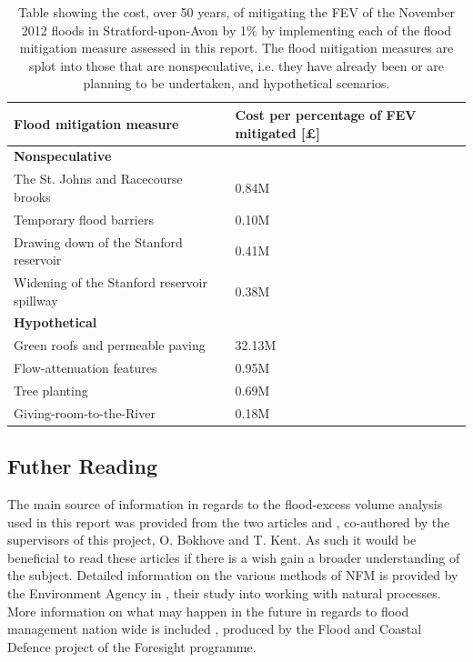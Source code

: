 \documentclass[11pt,a4paper]{article}
\begin{document}
\begin{table}[ht!]
\centering
\begin{tabular}{l|l}
Flood mitigation measure & Cost per percentage of FEV mitigated [\pounds]\\
\hline
\textbf{Nonspeculative} & \\
The St. Johns and Racecourse brooks & 0.84M\\
Temporary flood barriers & 0.10M\\
Drawing down of the Stanford reservoir & 0.41M\\
Widening of the Stanford reservoir spillway & 0.38M\\
\textbf{Hypothetical} & \\
Green roofs and permeable paving& 32.13M\\
Flow-attenuation features & 0.95M\\
Tree planting & 0.69M\\
Giving-room-to-the-River & 0.18M\\
\end{tabular}
\caption{Table showing the cost, over 50 years, of mitigating the FEV of the November 2012 floods in Stratford-upon-Avon by 1\% by implementing each of the flood mitigation measure assessed in this report. The flood mitigation measures are splot into those that are nonspeculative, i.e. they have already been or are planning to be undertaken, and hypothetical scenarios.}
\end{table}

\subsection{Futher Reading}
The main source of information in regards to the flood-excess volume analysis used in this report was provided from the two articles \cite{Aire} and \cite{Calder-Don}, co-authored by the supervisors of this project, O. Bokhove and T. Kent. As such it would be beneficial to read these articles if there is a wish gain a broader understanding of the subject. Detailed information on the various methods of NFM is provided by the Environment Agency in \cite{nfm}, their study into working with natural processes. More information on what may happen in the future in regards to flood management nation wide is included \cite{foresight}, produced by the Flood and Coastal Defence project of the Foresight programme.
\end{document}
